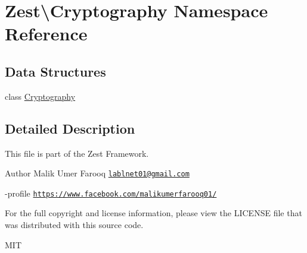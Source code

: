 \hypertarget{namespace_zest_1_1_cryptography}{}\section{Zest\textbackslash{}Cryptography Namespace Reference}
\label{namespace_zest_1_1_cryptography}
\subsection*{Data Structures}
\begin{DoxyCompactItemize}
\item 
class \mbox{\hyperlink{class_zest_1_1_cryptography_1_1_cryptography}{Cryptography}}
\end{DoxyCompactItemize}


\subsection{Detailed Description}
This file is part of the Zest Framework.

\begin{DoxyAuthor}{Author}
Malik Umer Farooq \href{mailto:lablnet01@gmail.com}{\tt lablnet01@gmail.\+com} 

-\/profile \href{https://www.facebook.com/malikumerfarooq01/}{\tt https\+://www.\+facebook.\+com/malikumerfarooq01/}
\end{DoxyAuthor}
For the full copyright and license information, please view the L\+I\+C\+E\+N\+SE file that was distributed with this source code.

M\+IT 